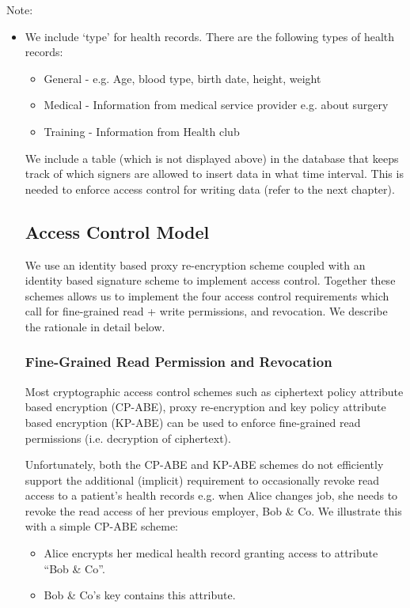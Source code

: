 \documentclass[]{article}
\begin{document}
Note: 
\begin{itemize}
\item We include ‘type’ for health records. There are the following types of health records:
\begin{itemize}
\item General - e.g. Age, blood type, birth date, height, weight 
\item Medical - Information from medical service provider e.g. about surgery
\item Training - Information from Health club
\end{itemize}
We include a table (which is not displayed above) in the database that keeps track of  which signers are allowed to insert data in what time interval. This is needed to enforce access control for writing data (refer to the next chapter).


\subsection{Access Control Model}
We use an identity based proxy re-encryption scheme coupled with an identity based signature scheme to implement access control. Together these schemes allows us to implement the four access control requirements which call for fine-grained read + write permissions, and revocation. We describe the rationale in detail below.
\subsubsection{Fine-Grained Read Permission and Revocation}

Most cryptographic access control schemes such as ciphertext policy attribute based encryption (CP-ABE), proxy re-encryption and key policy attribute based encryption (KP-ABE) can be used to enforce fine-grained read permissions (i.e. decryption of ciphertext).

Unfortunately, both the CP-ABE and KP-ABE schemes do not efficiently support the additional (implicit) requirement to occasionally revoke read access to a patient's health records e.g. when Alice changes job, she needs to revoke the read access of her previous employer, Bob \& Co. We illustrate this with a simple CP-ABE scheme:
\begin{itemize}
\item Alice encrypts her medical health record granting access to attribute “Bob \& Co”. 
\item Bob \& Co's key contains this attribute.
\end{itemize}


\end{itemize}
\end{document}
